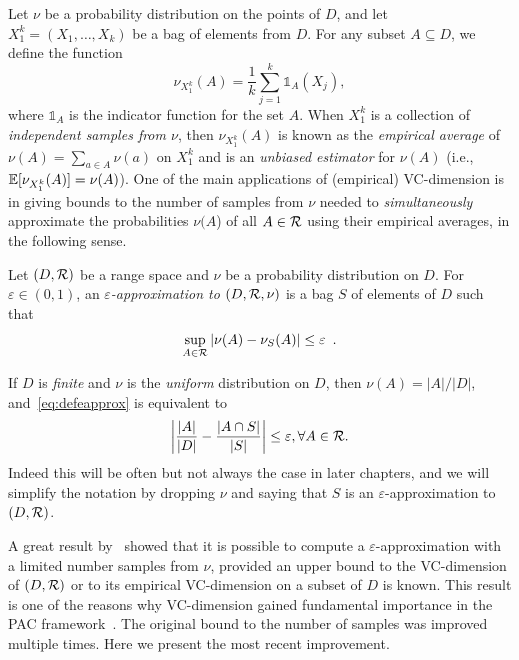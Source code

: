 Let $\nu$ be a probability distribution on the points of $D$, and let
$X_1^k=(X_1,\dotsc,X_k)$ be a bag of elements from $D$. For any subset
$A\subseteq D$, we define the function 
\[
\nu_{X_1^k}(A)=\frac{1}{k}\sum_{j=1}^k\mathds{1}_A(X_j),\]
where $\mathds{1}_A$ is the indicator function for the set $A$. When $X_1^k$ is
a collection of \emph{independent samples from $\nu$}, then $\nu_{X_1^k}(A)$ is known as the
\emph{empirical average} of $\nu(A)=\sum_{a\in A}\nu(a)$ on $X_1^k$ and is an
\emph{unbiased estimator} for $\nu(A)$ (i.e.,
$\mathbb{E}[\nu_{X_1^k}(A)]=\nu(A)$). One of the main applications of
(empirical) VC-dimension is in giving bounds to the number of samples from $\nu$
needed to \emph{simultaneously} approximate the probabilities $\nu(A$) of all
$A\in\mathcal{R}$ using their empirical averages, in the following sense.

\begin{definition}\label{def:eapprox}
  Let $(D,\mathcal{R})$ be a range space and $\nu$ be a probability distribution on
  $D$. For $\varepsilon\in(0,1)$, an \emph{$\varepsilon$-approximation to
  $(D,\mathcal{R},\nu)$} is a bag $S$ of elements of $D$ such that 
  \begin{equation}\label{eq:defeapprox}
  \sup_{A\in\mathcal{R}}|\nu(A)-\nu_S(A)|\le\varepsilon\enspace.
\end{equation}
\end{definition}

If $D$ is \emph{finite} and $\nu$ is the \emph{uniform} distribution on $D$, then
$\nu(A)=|A|/|D|$, and~\eqref{eq:defeapprox} is equivalent to
\[
\left|\frac{|A|}{|D|}-\frac{|A\cap S|}{|S|}\right|\le\varepsilon, \forall
A\in\mathcal{R}.
\]
Indeed this will be often but not always the case in later chapters, and we will
simplify the notation by dropping $\nu$ and saying that $S$ is an
$\varepsilon$-approximation to $(D,\mathcal{R})$.

A great result by~\citet{VapnikC71} showed that it is possible
to compute a $\varepsilon$-approximation with a limited number samples from
$\nu$, provided an upper bound to the VC-dimension of $(D,\mathcal{R})$ or to its
empirical VC-dimension on a subset of $D$ is known. This result is one of the
reasons why VC-dimension gained fundamental importance in the PAC
framework~\citep{KearnsV94}. The original bound to the number of samples was
improved multiple times. Here we present the most recent improvement.

